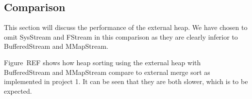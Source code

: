 \subsection{Comparison}

This section will discuss the performance of the external heap. We have chosen to omit SysStream and FStream in this comparison as they are clearly inferior to BufferedStream and MMapStream.

Figure~REF shows how heap sorting using the external heap with BufferedStream and MMapStream compare to external merge sort as implemented in project 1. It can be seen that they are both slower, which is to be expected.

